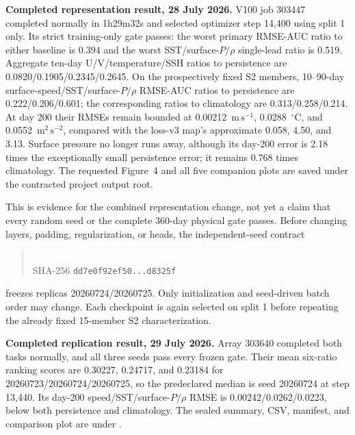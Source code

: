 \documentclass[11pt]{article}
\begin{document}
\textbf{Completed representation result, 28 July 2026.}  V100 job 303447 completed
normally in 1h29m32s and selected optimizer step 14,400 using split 1 only.  Its
strict training-only gate passes: the worst primary RMSE-AUC ratio to either baseline
is 0.394 and the worst SST/surface-\(P/\rho\) single-lead ratio is 0.519.  Aggregate
ten-day U/V/temperature/SSH ratios to persistence are
0.0820/0.1905/0.2345/0.2645.  On the prospectively fixed S2 members, 10--90-day
surface-speed/SST/surface-\(P/\rho\) RMSE-AUC ratios to persistence are
0.222/0.206/0.601; the corresponding ratios to climatology are
0.313/0.258/0.214.  At day 200 their RMSEs remain bounded at
0.00212~\(\mathrm{m\,s^{-1}}\), 0.0288~\({}^{\circ}\mathrm{C}\), and
0.0552~\(\mathrm{m^2\,s^{-2}}\), compared with the loss-v3 map's approximate
0.058, 4.50, and 3.13.  Surface pressure no longer runs away, although its day-200
error is 2.18 times the exceptionally small persistence error; it remains 0.768
times climatology.  The requested Figure~4 and all five companion plots are saved
under the contracted project output root.

This is evidence for the combined representation change, not yet a claim that every
random seed or the complete 360-day physical gate passes.  Before changing layers,
padding, regularization, or heads, the independent-seed contract
\begin{quote}
\\
SHA-256 \texttt{dd7e0f92ef50...d8325f}
\end{quote}
freezes replicas 20260724/20260725.  Only initialization and seed-driven batch order
may change.  Each checkpoint is again selected on split 1 before repeating the
already fixed 15-member S2 characterization.

\textbf{Completed replication result, 29 July 2026.}  Array 303640 completed both
tasks normally, and all three seeds pass every frozen gate.  Their mean six-ratio
ranking scores are 0.30227, 0.24717, and 0.23184 for
20260723/20260724/20260725, so the predeclared median is seed 20260724 at step
13,440.  Its day-200 speed/SST/surface-\(P/\rho\) RMSE is
0.00242/0.0262/0.0223, below both persistence and climatology.  The sealed summary,
CSV, manifest, and comparison plot are under
.
\end{document}
